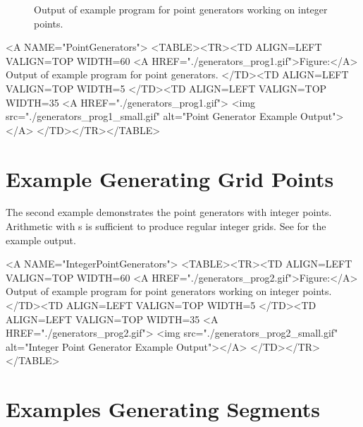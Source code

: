\begin{ccTexOnly}
\begin{figure}
\begin{minipage}{0.45\textwidth}
      \caption{Output of example program for point generators working
        on integer points.}
      \label{figureIntegerPointGenerator}
    \end{minipage}%
  \end{figure}
\end{ccTexOnly}

\begin{ccHtmlOnly}
  <A NAME="PointGenerators">
  <TABLE><TR><TD ALIGN=LEFT VALIGN=TOP WIDTH=60%
    <A HREF="./generators_prog1.gif">Figure:</A>
    Output of example program for point generators.
  </TD><TD ALIGN=LEFT VALIGN=TOP WIDTH=5%
  </TD><TD ALIGN=LEFT VALIGN=TOP WIDTH=35%
    <A HREF="./generators_prog1.gif">
        <img src="./generators_prog1_small.gif" 
             alt="Point Generator Example Output"></A>
  </TD></TR></TABLE>
\end{ccHtmlOnly}

\section{Example Generating Grid Points}

The second example demonstrates the point generators with integer
points. Arithmetic with s is sufficient to produce
regular integer grids. See 
for the example output.


\begin{ccHtmlOnly}
  <A NAME="IntegerPointGenerators">
  <TABLE><TR><TD ALIGN=LEFT VALIGN=TOP WIDTH=60%
    <A HREF="./generators_prog2.gif">Figure:</A>
        Output of example program for point generators working
        on integer points.
  </TD><TD ALIGN=LEFT VALIGN=TOP WIDTH=5%
  </TD><TD ALIGN=LEFT VALIGN=TOP WIDTH=35%
    <A HREF="./generators_prog2.gif">
        <img src="./generators_prog2_small.gif" 
             alt="Integer Point Generator Example Output"></A>
  </TD></TR></TABLE>
\end{ccHtmlOnly}%



\section{Examples Generating Segments}
\label{sec:segment_example}

